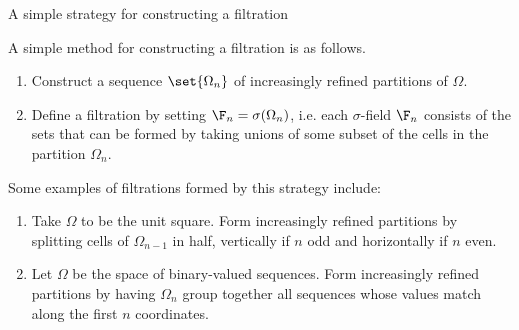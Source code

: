 \documentclass[10pt]{beamer}
\begin{document}
\begin{frame}{A simple strategy for constructing a filtration}

A simple method for constructing a filtration is as follows. 
%
\begin{enumerate}
	\item Construct a sequence $\set{\Omega_n}$ of increasingly refined partitions of $\Omega$.
	\item Define a filtration by setting $\F_n = \sigma(\Omega_n)$, i.e. each $\sigma$-field $\F_n$ consists of the sets that can be formed by taking unions of some subset of the cells in the partition $\Omega_n$.
\end{enumerate}
%
Some examples of filtrations formed by this strategy include:
%
\begin{enumerate}
	\item Take $\Omega$ to be the unit square. Form increasingly refined partitions by splitting cells of $\Omega_{n-1}$ in half, vertically if $n$ odd and horizontally if $n$ even.  
	\item  Let $\Omega$ be the space of binary-valued sequences. Form increasingly refined partitions by having $\Omega_{n}$ group together all sequences whose values match along the first $n$ coordinates. 
\end{enumerate}
\end{frame}
\end{document}
